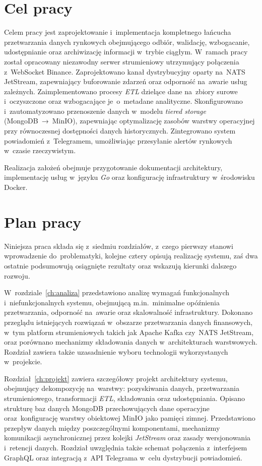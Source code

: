 \section{Cel pracy}

Celem pracy jest zaprojektowanie i~implementacja kompletnego łańcucha przetwarzania danych rynkowych obejmującego odbiór, walidację, wzbogacanie, udostępnianie oraz archiwizację informacji w~trybie ciągłym.
W~ramach pracy został opracowany niezawodny serwer strumieniowy utrzymujący połączenia z~WebSocket Binance.
Zaprojektowano kanał dystrybucyjny oparty na~NATS JetStream, zapewniający buforowanie zdarzeń oraz odporność na~awarie usług zależnych.
Zaimplementowano procesy \textit{ETL} dzielące dane na~zbiory surowe i~oczyszczone oraz wzbogacające je~o~metadane analityczne.
Skonfigurowano i~zautomatyzowano przenoszenie danych w~modelu \textit{tiered storage} (MongoDB~→~MinIO), zapewniając optymalizację zasobów warstwy operacyjnej przy równoczesnej dostępności danych historycznych.
Zintegrowano system powiadomień z~Telegramem, umożliwiając przesyłanie alertów rynkowych w~czasie rzeczywistym.

Realizacja założeń obejmuje przygotowanie dokumentacji architektury, implementację usług w~języku \textit{Go} oraz konfigurację infrastruktury w~środowisku Docker.


\section{Plan pracy}

Niniejsza praca składa się z~siedmiu rozdziałów, z~czego pierwszy stanowi wprowadzenie do~problematyki, kolejne cztery opisują realizację systemu, zaś dwa ostatnie podsumowują osiągnięte rezultaty oraz wskazują kierunki dalszego rozwoju.

W~rozdziale~\ref{ch:analiza} przedstawiono analizę wymagań funkcjonalnych i~niefunkcjonalnych systemu, obejmującą m.in.\ minimalne opóźnienia przetwarzania, odporność na~awarie oraz skalowalność infrastruktury.
Dokonano przeglądu istniejących rozwiązań w~obszarze przetwarzania danych finansowych, w~tym platform strumieniowych takich jak Apache Kafka czy~NATS JetStream, oraz porównano mechanizmy składowania danych w~architekturach warstwowych.
Rozdział zawiera także uzasadnienie wyboru technologii wykorzystanych w~projekcie.

Rozdział~\ref{ch:projekt} zawiera szczegółowy projekt architektury systemu, obejmujący dekompozycję na~warstwy: pozyskiwania danych, przetwarzania strumieniowego, transformacji \textit{ETL}, składowania oraz udostępniania.
Opisano strukturę baz danych MongoDB przechowujących dane operacyjne oraz~konfigurację warstwy obiektowej MinIO jako pamięci zimnej.
Przedstawiono przepływ danych między poszczególnymi komponentami, mechanizmy komunikacji asynchronicznej przez kolejki \textit{JetStream} oraz zasady wersjonowania i~retencji danych.
Rozdział uwzględnia także schemat połączenia z~interfejsem GraphQL oraz integracją z~API Telegrama w~celu dystrybucji powiadomień.

